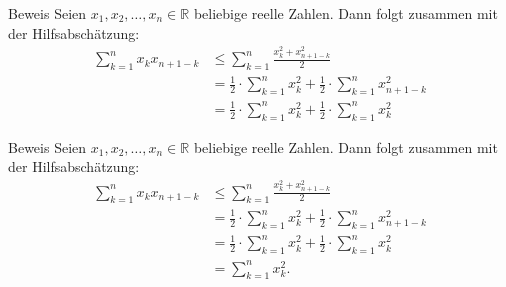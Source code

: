 \documentclass[10pt]{beamer}
\def\bR{\mathbb{R}}
\begin{document}
\begin{frame}{Beweis}
    Seien \( x_{1}, x_{2}, \ldots, x_{n} \in \bR \) beliebige reelle Zahlen. Dann folgt zusammen mit der Hilfsabschätzung:
    \begin{align*}
        \sum_{k = 1}^{n} x_{k}x_{n + 1 - k}
        & \leq \sum_{k = 1}^{n} \frac{x_{k}^{2} + x_{n + 1 - k}^{2}}{2} \\
        & = \frac{1}{2} \cdot \sum_{k = 1}^{n} x_{k}^{2} + \frac{1}{2} \cdot \sum_{k = 1}^{n} x_{n + 1 - k}^{2} \\
        & = \frac{1}{2} \cdot \sum_{k = 1}^{n} x_{k}^{2} + \frac{1}{2} \cdot \sum_{k = 1}^{n} x_{k}^{2} 
    \end{align*}
\end{frame}



\begin{frame}{Beweis}
    Seien \( x_{1}, x_{2}, \ldots, x_{n} \in \bR \) beliebige reelle Zahlen. Dann folgt zusammen mit der Hilfsabschätzung:
    \begin{align*}
        \sum_{k = 1}^{n} x_{k}x_{n + 1 - k}
        & \leq \sum_{k = 1}^{n} \frac{x_{k}^{2} + x_{n + 1 - k}^{2}}{2} \\
        & = \frac{1}{2} \cdot \sum_{k = 1}^{n} x_{k}^{2} + \frac{1}{2} \cdot \sum_{k = 1}^{n} x_{n + 1 - k}^{2} \\
        & = \frac{1}{2} \cdot \sum_{k = 1}^{n} x_{k}^{2} + \frac{1}{2} \cdot \sum_{k = 1}^{n} x_{k}^{2} \\
        & = \sum_{k = 1}^{n} x_{k}^{2}.
    \end{align*}
\end{frame}
\end{document}

